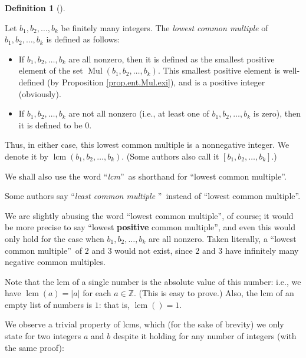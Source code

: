 \documentclass[numbers=enddot,12pt,final,onecolumn,notitlepage]{scrartcl}%
\numberwithin{exer}{subsection}
\theoremstyle{definition}
\newtheorem{defi}[theo]{Definition}
\newenvironment{definition}[1][]
{\begin{defi}[#1]\begin{leftbar}}
{\end{leftbar}\end{defi}}
\begin{document}
\begin{definition}
\label{def.ent.lcm.lcm}Let $b_{1},b_{2},\ldots,b_{k}$ be finitely many
integers. The \textit{lowest common multiple} of $b_{1},b_{2},\ldots,b_{k}$ is
defined as follows:

\begin{itemize}
\item If $b_{1},b_{2},\ldots,b_{k}$ are all nonzero, then it is defined as the
smallest positive element of the set $\operatorname*{Mul}\left(  b_{1}%
,b_{2},\ldots,b_{k}\right)  $. This smallest positive element is well-defined
(by Proposition \ref{prop.ent.Mul.exi}), and is a positive integer (obviously).

\item If $b_{1},b_{2},\ldots,b_{k}$ are not all nonzero (i.e., at least one of
$b_{1},b_{2},\ldots,b_{k}$ is zero), then it is defined to be $0$.
\end{itemize}

Thus, in either case, this lowest common multiple is a nonnegative integer. We
denote it by $\operatorname{lcm}\left(  b_{1},b_{2},\ldots,b_{k}\right)  $.
(Some authors also call it $\left[  b_{1},b_{2},\ldots,b_{k}\right]  $.)

We shall also use the word \textquotedblleft\textit{lcm}\textquotedblright\ as
shorthand for \textquotedblleft lowest common multiple\textquotedblright.
\end{definition}

Some authors say \textquotedblleft\textit{least common multiple}%
\textquotedblright\ instead of \textquotedblleft lowest common
multiple\textquotedblright.

We are slightly abusing the word \textquotedblleft lowest common
multiple\textquotedblright, of course; it would be more precise to say
\textquotedblleft lowest \textbf{positive} common multiple\textquotedblright,
and even this would only hold for the case when $b_{1},b_{2},\ldots,b_{k}$ are
all nonzero. Taken literally, a \textquotedblleft lowest common
multiple\textquotedblright\ of $2$ and $3$ would not exist, since $2$ and $3$
have infinitely many negative common multiples.

Note that the lcm of a single number is the absolute value of this number:
i.e., we have $\operatorname{lcm}\left(  a\right)  =\left\vert a\right\vert $
for each $a\in\mathbb{Z}$. (This is easy to prove.) Also, the lcm of an empty
list of numbers is $1$: that is, $\operatorname{lcm}\left(  {}\right)  =1$.

We observe a trivial property of lcms, which (for the sake of brevity) we only
state for two integers $a$ and $b$ despite it holding for any number of
integers (with the same proof):
\end{document}
